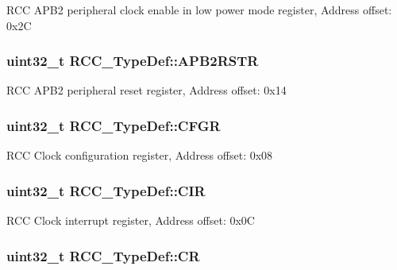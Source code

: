 R\-C\-C A\-P\-B2 peripheral clock enable in low power mode register, Address offset\-: 0x2\-C \hypertarget{struct_r_c_c___type_def_a4491ab20a44b70bf7abd247791676a59}{
\subsubsection[{A\-P\-B2\-R\-S\-T\-R}]{ uint32\-\_\-t R\-C\-C\-\_\-\-Type\-Def\-::\-A\-P\-B2\-R\-S\-T\-R}}\label{struct_r_c_c___type_def_a4491ab20a44b70bf7abd247791676a59}
R\-C\-C A\-P\-B2 peripheral reset register, Address offset\-: 0x14 \hypertarget{struct_r_c_c___type_def_a0721b1b729c313211126709559fad371}{
\subsubsection[{C\-F\-G\-R}]{ uint32\-\_\-t R\-C\-C\-\_\-\-Type\-Def\-::\-C\-F\-G\-R}}\label{struct_r_c_c___type_def_a0721b1b729c313211126709559fad371}
R\-C\-C Clock configuration register, Address offset\-: 0x08 \hypertarget{struct_r_c_c___type_def_aeadf3a69dd5795db4638f71938704ff0}{
\subsubsection[{C\-I\-R}]{ uint32\-\_\-t R\-C\-C\-\_\-\-Type\-Def\-::\-C\-I\-R}}\label{struct_r_c_c___type_def_aeadf3a69dd5795db4638f71938704ff0}
R\-C\-C Clock interrupt register, Address offset\-: 0x0\-C \hypertarget{struct_r_c_c___type_def_abcb9ff48b9afb990283fefad0554b5b3}{
\subsubsection[{C\-R}]{ uint32\-\_\-t R\-C\-C\-\_\-\-Type\-Def\-::\-C\-R}}\label{struct_r_c_c___type_def_abcb9ff48b9afb990283fefad0554b5b3}
